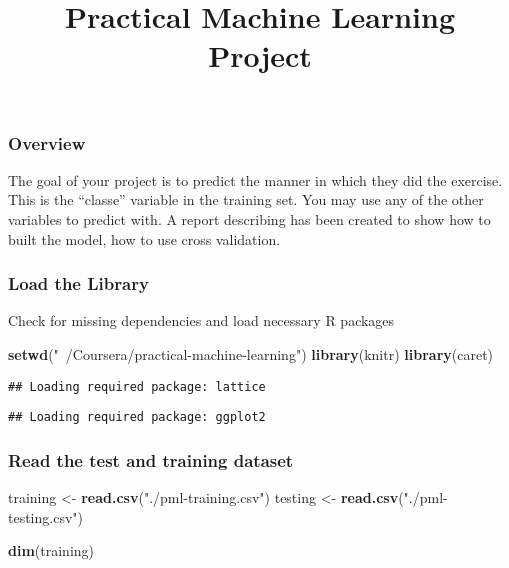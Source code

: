 \documentclass[]{article}
\title{Practical Machine Learning Project}
\author{}
\date{\vspace{-2.5em}}
\newenvironment{Shaded}{\begin{snugshade}}{\end{snugshade}}
\newcommand{\KeywordTok}[1]{\textcolor[rgb]{0.13,0.29,0.53}{\textbf{#1}}}
\newcommand{\StringTok}[1]{\textcolor[rgb]{0.31,0.60,0.02}{#1}}
\newcommand{\NormalTok}[1]{#1}
\begin{document}
\maketitle

\subsubsection{Overview}\label{overview}

The goal of your project is to predict the manner in which they did the
exercise. This is the ``classe'' variable in the training set. You may
use any of the other variables to predict with. A report describing has
been created to show how to built the model, how to use cross
validation.

\subsubsection{Load the Library}\label{load-the-library}

Check for missing dependencies and load necessary R packages

\begin{Shaded}
\begin{Highlighting}[]
\KeywordTok{setwd}\NormalTok{(}\StringTok{"~/Coursera/practical-machine-learning"}\NormalTok{)}
\KeywordTok{library}\NormalTok{(knitr)}
\KeywordTok{library}\NormalTok{(caret)}
\end{Highlighting}
\end{Shaded}

\begin{verbatim}
## Loading required package: lattice
\end{verbatim}

\begin{verbatim}
## Loading required package: ggplot2
\end{verbatim}

\subsubsection{Read the test and training
dataset}\label{read-the-test-and-training-dataset}

\begin{Shaded}
\begin{Highlighting}[]
\NormalTok{training <-}\StringTok{ }\KeywordTok{read.csv}\NormalTok{(}\StringTok{"./pml-training.csv"}\NormalTok{)}
\NormalTok{testing <-}\StringTok{ }\KeywordTok{read.csv}\NormalTok{(}\StringTok{"./pml-testing.csv"}\NormalTok{)}

\KeywordTok{dim}\NormalTok{(training)}
\end{Highlighting}
\end{Shaded}
\end{document}
